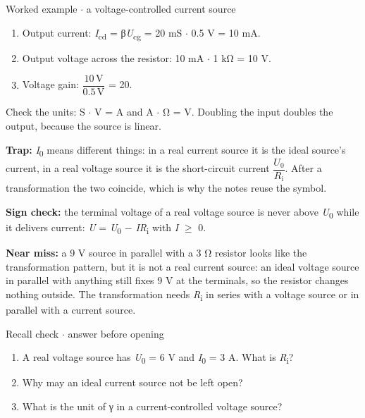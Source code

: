 \documentclass[11pt]{article}
\begin{document}
\begin{keepsection}
\begin{keepsection}
\begin{workedbox}{Worked example \ensuremath{\cdot} a voltage-controlled current source}
\begin{enumerate}
\item Output current: \textit{I}\textsubscript{cd} = β\textit{U}\textsubscript{cg} = 20 mS \ensuremath{\cdot} 0.5 V = 10 mA.
\item Output voltage across the resistor: 10 mA \ensuremath{\cdot} 1 kΩ = 10 V.
\item Voltage gain: {\small\ensuremath{\dfrac{10\, \mathrm{V}}{0.5\, \mathrm{V}}}} = 20.
\end{enumerate}

Check the units: S \ensuremath{\cdot} V = A and A \ensuremath{\cdot} Ω = V. Doubling the input doubles the output, because the source is linear.
\end{workedbox}

\begin{notebox}\textbf{Trap:} \textit{I}\textsubscript{0} means different things: in a real current source it is the ideal source’s current, in a real voltage source it is the short-circuit current {\small\ensuremath{\dfrac{{U}_{0}}{{R}_{\mathrm{i}}}}}. After a transformation the two coincide, which is why the notes reuse the symbol.\end{notebox}

\begin{notebox}\textbf{Sign check:} the terminal voltage of a real voltage source is never above \textit{U}\textsubscript{0} while it delivers current: \textit{U} = \textit{U}\textsubscript{0} \ensuremath{-} \textit{I}\textit{R}\textsubscript{i} with \textit{I} \ensuremath{\geq} 0.\end{notebox}

\begin{notebox}\textbf{Near miss:} a 9 V source in parallel with a 3 Ω resistor looks like the transformation pattern, but it is not a real current source: an ideal voltage source in parallel with anything still fixes 9 V at the terminals, so the resistor changes nothing outside. The transformation needs \textit{R}\textsubscript{i} in series with a voltage source or in parallel with a current source.\end{notebox}

\begin{recallbox}{Recall check \ensuremath{\cdot} answer before opening}
\begin{enumerate}
\item A real voltage source has \textit{U}\textsubscript{0} = 6 V and \textit{I}\textsubscript{0} = 3 A. What is \textit{R}\textsubscript{i}?
\item Why may an ideal current source not be left open?
\item What is the unit of γ in a current-controlled voltage source?
\end{enumerate}


\end{recallbox}
\end{keepsection}
\end{keepsection}
\end{document}
